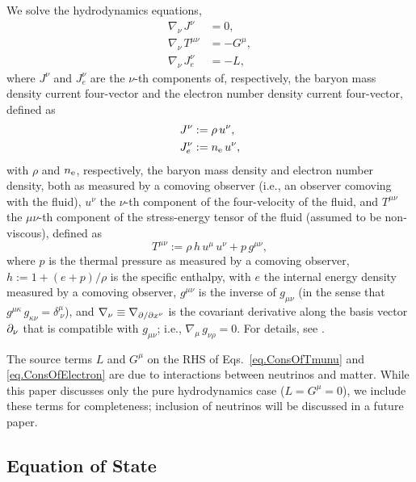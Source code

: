 We solve the hydrodynamics equations,
\begin{align}
  \nabla_{\nu}\,J^{\nu}&=0,\label{eq.ConsOfMass}\\
  \nabla_{\nu}\,T^{\mu\nu}&=-G^{\mu}\label{eq.ConsOfTmunu},\\
  \nabla_{\nu}\,J_{e}^{\nu}&=-L\label{eq.ConsOfElectron},
\end{align}
where $J^{\nu}$ and $J_{e}^{\nu}$ are the $\nu$-th components of, respectively,
the baryon mass density current four-vector and
the electron number density current four-vector,
defined as
\begin{align}
  J^{\nu}&:=\rho\,u^{\nu},\\
  J_{e}^{\nu}&:=n_{\mathrm{e}}\,u^{\nu},
\end{align}
with $\rho$ and $n_{\mathrm{e}}$, respectively, the baryon mass density
and electron number density, both as measured by a comoving observer
(i.e., an observer comoving with the fluid),
$u^{\nu}$ the $\nu$-th component of the four-velocity of the fluid,
and $T^{\mu\nu}$ the $\mu\nu$-th component of the
stress-energy tensor of the fluid (assumed to be non-viscous),
defined as
\begin{equation}
  T^{\mu\nu}:=\rho\,h\,u^{\mu}\,u^{\nu}+p\,g^{\mu\nu},
  \label{eq.Tmunu}
\end{equation}
where $p$ is the thermal pressure as measured by a comoving observer,
$h:=1+\left(e+p\right)/\rho$ is the specific enthalpy, with $e$ the internal
energy density measured by a comoving observer, $g^{\mu\nu}$ is the
inverse of $g_{\mu\nu}$ (in the sense that
$g^{\mu\kappa}\,g_{\kappa\nu}=\delta^{\mu}_{~\nu}$),
and $\nabla_{\nu}\equiv\nabla_{\partial/\partial x^{\nu}}$ is the covariant derivative along the basis vector
$\partial_{\nu}$ that is compatible
with $g_{\mu\nu}$; i.e., $\nabla_{\mu}\,g_{\nu\rho}=0$.
For details, see \citet{rz2013}.

The source terms $L$ and $G^{\mu}$ on the RHS of Eqs.~\eqref{eq.ConsOfTmunu}
and \eqref{eq.ConsOfElectron} are due to interactions between
neutrinos and matter.
While this paper discusses only the pure hydrodynamics case ($L=G^{\mu}=0$),
we include these terms for completeness;
inclusion of neutrinos will be discussed in a future paper.

\subsection{Equation of State}

